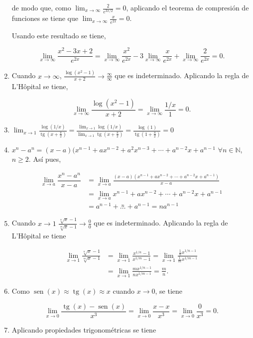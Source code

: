 \documentclass[
  a4paper,
]{scrreport}
\theoremstyle{definition}
\theoremstyle{remark}
\begin{document}
\begin{tcolorbox}
\begin{enumerate}
  de modo que, como \(\lim_{x\to\infty}\frac{2}{e^{3x/2}}=0\), aplicando
  el teorema de compresión de funciones se tiene que
  \(\lim_{x\to\infty} \frac{x}{e^{2x}}=0\).

  Usando este resultado se tiene,

  \[\lim_{x\to\infty}\dfrac{x^2-3x+2}{e^{2x}} = \lim_{x\to\infty}\dfrac{x^2}{e^{2x}}-3\lim_{x\to\infty} \frac{x}{e^{2x}} + \lim_{x\to\infty} \frac{2}{e^{2x}} = 0.
   \]
\item
  Cuando \(x\to\infty\),
  \(\frac{\log(x^2-1)}{x+2}\to \frac{\infty}{\infty}\) que es
  indeterminado. Aplicando la regla de L'Hôpital se tiene,

  \[
   \lim_{x\to\infty}\dfrac{\log(x^2-1)}{x+2} =\lim_{x\to\infty}\frac{1/x}{1} =0.
   \]
\item
  \(\displaystyle \lim_{x\to 1}\frac{\log(1/x)}{\operatorname{tg}(x+\frac{\pi}{2})} = \frac{\lim_{x\to 1}\log(1/x)}{\lim_{x\to 1}\operatorname{tg}(x+\frac{\pi}{2})} = \frac{\log(1)}{\operatorname{tg}(1+\frac{\pi}{2})}=0\)
\item
  \(x^n-a^n = (x-a)(x^{n-1}+ax^{n-2}+a^2x^{n-3}+\cdots + a^{n-2}x+a^{n-1}\)
  \(\forall n\in\mathbb{N}\), \(n\geq 2\). Así pues,

  \begin{align*}
   \lim_{x\to a}\dfrac{x^n-a^n}{x-a} &= \lim_{x\to a}\frac{(x-a)(x^{n-1}+ax^{n-2}+\cdots + a^{n-2}x+a^{n-1})}{x-a} \\ 
   &= \lim_{x\to a} x^{n-1}+ax^{n-2}+\cdots + a^{n-2}x+a^{n-1}\\  
   &= a^{n-1}+\stackrel{n}{\dots}+a^{n-1} = na^{n-1}
   \end{align*}
\item
  Cuando \(x\to 1\)
  \(\frac{\sqrt[n]{x}-1}{\sqrt[m]{x}-1}\to \frac{0}{0}\) que es
  indeterminado. Aplicando la regla de L'Hôpital se tiene

  \begin{align*}
   \lim_{x\to 1}\frac{\sqrt[n]{x}-1}{\sqrt[m]{x}-1} &= \lim_{x\to 1}\frac{x^{1/n}-1}{x^{1/m}-1} = \lim_{x\to 1}\frac{\frac{1}{n}x^{1/n-1}}{\frac{1}{m}x^{1/m-1}}\\  
   &= \lim_{x\to 1}\frac{mx^{1/n-1}}{nx^{1/m-1}} = \frac{m}{n}.
   \end{align*}
\item
  Como \(\operatorname{sen}(x)\approx\operatorname{tg}(x)\approx x\)
  cuando \(x\to 0\), se tiene

  \[
   \lim_{x\to 0}\frac{\operatorname{tg}(x)-\operatorname{sen}(x)}{x^3} = \lim_{x\to 0}\frac{x-x}{x^3} = \lim_{x\to 0}\frac{0}{x^3} = 0.
   \]
\item
  Aplicando propiedades trigonométricas se tiene


\end{enumerate}
\end{tcolorbox}
\end{document}
